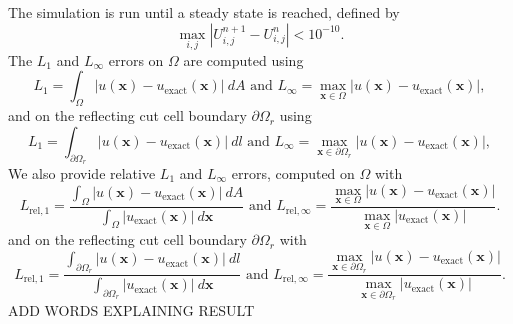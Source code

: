 The simulation is run until a steady state is reached, defined by 
$$
\max_{i,j}|U^{n+1}_{i,j}-U^{n}_{i,j}| < 10^{-10}.
$$
The $L_1$ and $L_\infty$ errors on $\Omega$ are computed using
$$
L_{1} = \int_{\Omega}|u(\mathbf{x}) - u_{\text{exact}}(\mathbf{x})|~dA \text{ and }
L_{\infty} =  \max_{\mathbf{x} \in \Omega}|u(\mathbf{x}) - u_{\text{exact}}(\mathbf{x})|,
$$
and on the reflecting cut cell boundary $\partial \Omega_r$ using
$$
L_{1} = \int_{\partial \Omega_r}|u(\mathbf{x}) - u_{\text{exact}}(\mathbf{x})|~dl \text{ and }
L_{\infty} =  \max_{\mathbf{x} \in \partial \Omega_r}|u(\mathbf{x}) - u_{\text{exact}}(\mathbf{x})|,
$$
We also provide relative $L_1$ and $L_\infty$ errors, computed on $\Omega$ with
$$
L_{\text{rel},1} =  \frac{\int_{\Omega}|u(\mathbf{x}) - u_{\text{exact}}(\mathbf{x})|~dA}{\int_{\Omega}|u_{\text{exact}}(\mathbf{x})|~d\mathbf{x}} \text{ and }
L_{\text{rel},\infty} =  \frac{\max_{\mathbf{x} \in \Omega}|u(\mathbf{x}) - u_{\text{exact}}(\mathbf{x})|}{\max_{\mathbf{x} \in \Omega}| u_{\text{exact}}(\mathbf{x})|}.
$$
and on the reflecting cut cell boundary $\partial \Omega_r$ with
$$
L_{\text{rel},1} =  \frac{\int_{\partial \Omega_r}|u(\mathbf{x}) - u_{\text{exact}}(\mathbf{x})|~dl}{\int_{\partial \Omega_r}|u_{\text{exact}}(\mathbf{x})|~d\mathbf{x}} \text{ and }
L_{\text{rel},\infty} =  \frac{\max_{\mathbf{x} \in \partial \Omega_r}|u(\mathbf{x}) - u_{\text{exact}}(\mathbf{x})|}{\max_{\mathbf{x} \in \partial \Omega_r}| u_{\text{exact}}(\mathbf{x})|}.
$$
ADD WORDS EXPLAINING RESULT


